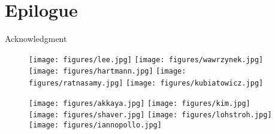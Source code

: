 \section{Epilogue}

\begin{frame}{Acknowledgment}

  \begin{figure}
    \texttt{[image: figures/lee.jpg]}
    \hfill
    \texttt{[image: figures/wawrzynek.jpg]}
    \hfill
    \texttt{[image: figures/hartmann.jpg]}
    \hfill
    \texttt{[image: figures/ratnasamy.jpg]}
    \hfill
    \texttt{[image: figures/kubiatowicz.jpg]}
    \hfill
  \end{figure}

  \begin{figure}
    \texttt{[image: figures/akkaya.jpg]}
    \hfill
    \texttt{[image: figures/kim.jpg]}
    \hfill
    \texttt{[image: figures/shaver.jpg]}
    \hfill
    \texttt{[image: figures/lohstroh.jpg]}
    \hfill
    \texttt{[image: figures/iannopollo.jpg]}
    \hfill
  \end{figure}

\end{frame}



